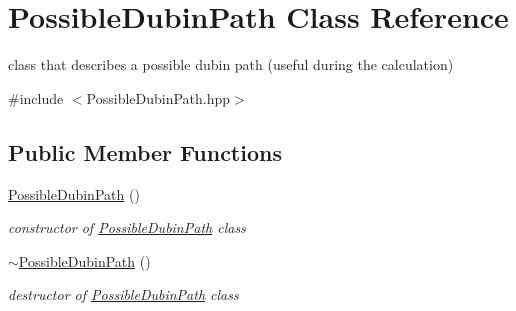 \hypertarget{class_possible_dubin_path}{}\section{Possible\+Dubin\+Path Class Reference}
\label{class_possible_dubin_path}


class that describes a possible dubin path (useful during the calculation)  




{\ttfamily \#include $<$Possible\+Dubin\+Path.\+hpp$>$}

\subsection*{Public Member Functions}
\begin{DoxyCompactItemize}
\item 
\mbox{\label{class_possible_dubin_path_a1b5581a6922da0c296bb3101081e64fe}} 
\mbox{\hyperlink{class_possible_dubin_path_a1b5581a6922da0c296bb3101081e64fe}{Possible\+Dubin\+Path}} ()
\begin{DoxyCompactList}\small\item\em constructor of \mbox{\hyperlink{class_possible_dubin_path}{Possible\+Dubin\+Path}} class \end{DoxyCompactList}\item 
\mbox{\label{class_possible_dubin_path_a6fdb36aaf60e69133e99511fe2abed4d}} 
\mbox{\hyperlink{class_possible_dubin_path_a6fdb36aaf60e69133e99511fe2abed4d}{$\sim$\+Possible\+Dubin\+Path}} ()
\begin{DoxyCompactList}\small\item\em destructor of \mbox{\hyperlink{class_possible_dubin_path}{Possible\+Dubin\+Path}} class \end{DoxyCompactList}\end{DoxyCompactItemize}
